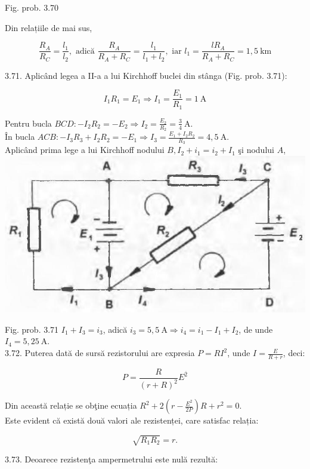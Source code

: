 \documentclass[10pt]{article}
\begin{document}
Fig. prob. 3.70

Din relațiile de mai sus,

$$
\frac{R_{A}}{R_{C}}=\frac{l_{1}}{l_{2}}, \text { adică } \frac{R_{A}}{R_{A}+R_{C}}=\frac{l_{1}}{l_{1}+l_{2}}, \text { iar } l_{1}=\frac{l R_{A}}{R_{A}+R_{C}}=1,5 \mathrm{~km}
$$

3.71. Aplicând legea a II-a a lui Kirchhoff buclei din stânga (Fig. prob. 3.71):

$$
I_{1} R_{1}=E_{1} \Rightarrow I_{1}=\frac{E_{1}}{R_{1}}=1 \mathrm{~A}
$$

Pentru bucla $B C D:-I_{2} R_{2}=-E_{2} \Rightarrow I_{2}=\frac{E_{2}}{R_{2}}=\frac{3}{4} \mathrm{~A}$.\\
În bucla $A C B:-I_{3} R_{3}+I_{2} R_{2}=-E_{1} \Rightarrow I_{3}=\frac{E_{1}+I_{2} R_{2}}{R_{3}}=4,5 \mathrm{~A}$.\\
Aplicând prima lege a lui Kirchhoff nodului $B, I_{2}+i_{1}=i_{2}+I_{1}$ şi nodului $A$,\\
\includegraphics[max width=\textwidth, center]{2025_07_01_5b3ff9fa0d508c8e9f17g-355}

Fig. prob. 3.71 $I_{1}+I_{3}=i_{3}$, adică $i_{3}=5,5 \mathrm{~A} \Rightarrow i_{4}=i_{1}-I_{1}+I_{2}$, de unde $I_{4}=5,25 \mathrm{~A}$.\\
3.72. Puterea dată de sursă rezistorului are expresia $P=R I^{2}$, unde $I=\frac{E}{R+r}$, deci:

$$
P=\frac{R}{(r+R)^{2}} E^{\overline{2}}
$$

Din această relație se obţine ecuația $R^{2}+2\left(r-\frac{E^{2}}{2 P}\right) R+r^{2}=0$.\\
Este evident că există două valori ale rezistenței, care satisfac relația:

$$
\sqrt{R_{1} R_{2}}=r .
$$

3.73. Deoarece rezistenţa ampermetrului este nulă rezultă:
\end{document}
